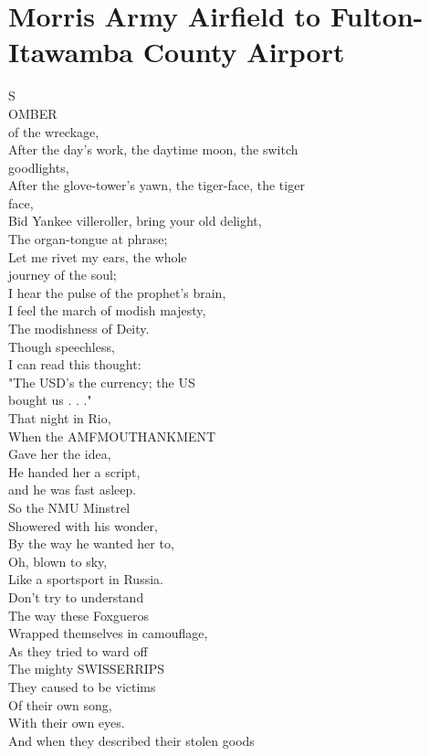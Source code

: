 \documentclass[smalldemyvopaper,11pt,twoside,onecolumn,openright,extrafontsizes]{memoir}
\begin{document}
\chapter{Morris Army Airfield to Fulton-Itawamba County Airport}
S
\\OMBER
\\of the wreckage,
\\After the day's work, the daytime moon, the switch
\\goodlights,
\\After the glove-tower's yawn, the tiger-face, the tiger
\\face,
\\Bid Yankee villeroller, bring your old delight,
\\The organ-tongue at phrase;
\\Let me rivet my ears, the whole
\\journey of the soul;
\\I hear the pulse of the prophet's brain,
\\I feel the march of modish majesty,
\\The modishness of Deity.
\\Though speechless,
\\I can read this thought:
\\"The USD's the currency; the US
\\bought us . . ."
\\That night in Rio,
\\When the AMFMOUTHANKMENT
\\Gave her the idea,
\\He handed her a script,
\\and he was fast asleep.
\\So the NMU Minstrel
\\Showered with his wonder,
\\By the way he wanted her to,
\\Oh, blown to sky,
\\Like a sportsport in Russia.
\\Don't try to understand
\\The way these Foxgueros
\\Wrapped themselves in camouflage,
\\As they tried to ward off
\\The mighty SWISSERRIPS
\\They caused to be victims
\\Of their own song,
\\With their own eyes.
\\And when they described their stolen goods
\end{document}
